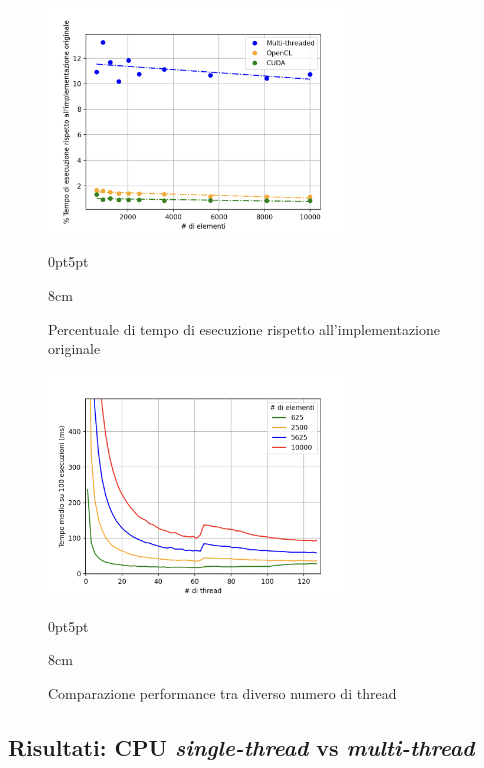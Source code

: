 \begin{figure}[!ht]
  \begin{minipage}[t]{0.5\linewidth}
    \centering
    \includegraphics[width=8cm]{images/results/gain-perc-better.png}
    \begin{adjustwidth}
      {0pt}{5pt}
      \begin{varwidth}
        {8cm}
        \caption{Percentuale di tempo di esecuzione rispetto all'implementazione
        originale}
        \label{fig:perc-better}
      \end{varwidth}
    \end{adjustwidth}
  \end{minipage}
  \begin{minipage}[t]{0.5\linewidth}
    \centering
    \includegraphics[width=8cm]{images/results/gain-comp-threads.png}
    \begin{adjustwidth}
      {0pt}{5pt}
      \begin{varwidth}
        {8cm}
        \caption{Comparazione performance tra diverso numero di thread}
        \label{fig:risultati-cpu}
      \end{varwidth}
    \end{adjustwidth}
  \end{minipage}
\end{figure}

\subsection{Risultati: CPU \textit{single-thread} vs \textit{multi-thread}}
\label{subsec:risultati-cpu}

